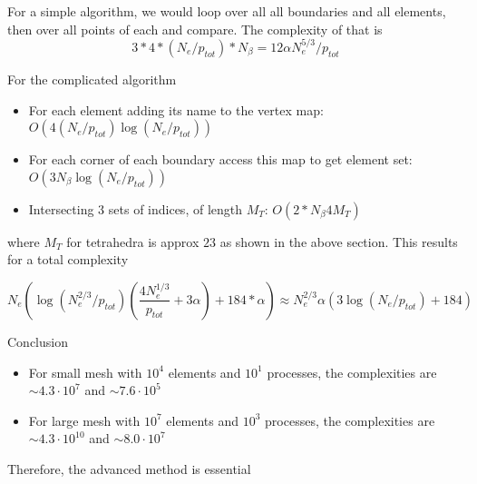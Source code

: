 \documentclass[12pt]{article}
\begin{document}
\noindent
For a simple algorithm, we would loop over all all boundaries and all elements, then over all points of each and compare.
The complexity of that is \[ 3*4 * (N_e / p_{tot}) * N_{\beta} = 12 \alpha N_e^{5/3} / p_{tot} \]

\noindent
For the complicated algorithm
\begin{itemize}
	\item For each element adding its name to the vertex map: $O(4 (N_e / p_{tot}) \log(N_e / p_{tot}) )$
	\item For each corner of each boundary access this map to get element set: $O(3 N_{\beta} \log(N_e / p_{tot}))$
	\item Intersecting 3 sets of indices, of length $M_T$: $O(2 * N_{\beta} 4M_T)$
\end{itemize}
\noindent
where $M_T$ for tetrahedra is approx $23$ as shown in the above section. This results for a total complexity

\[ N_e(    \log(N_e^{2/3} / p_{tot})(\frac{4 N_e^{1/3}}{p_{tot}} + 3 \alpha ) + 184 * \alpha)  \approx  N_e^{2/3} \alpha (3 \log(N_e / p_{tot}) + 184)  \]

\noindent
Conclusion
\begin{itemize}
	\item For small mesh with $10^4$ elements and $10^1$ processes, the complexities are $\sim 4.3\cdot 10^7$ and $\sim 7.6 \cdot 10^5$
	\item For large mesh with $10^7$ elements and $10^3$ processes, the complexities are $\sim 4.3\cdot 10^{10}$ and $\sim 8.0 \cdot 10^7$
\end{itemize}
\noindent
Therefore, the advanced method is essential
\end{document}
